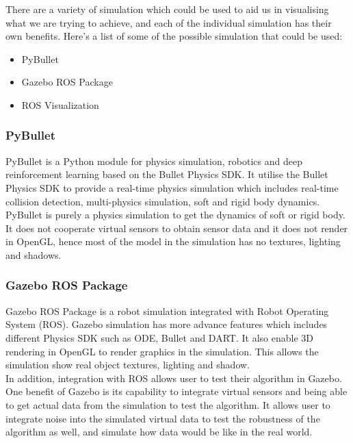 \documentclass[12pt,A4]{article}
\begin{document}
	There are a variety of simulation which could be used to aid us in visualising what we are trying to achieve, and each of the individual simulation has their own benefits. Here's a list of some of the possible simulation that could be used:
	
	\begin{itemize}
		\item PyBullet
		\item Gazebo ROS Package
		\item ROS Visualization
	\end{itemize}
	
	\subsubsection{PyBullet}
	\hfill\begin{minipage}{\dimexpr\textwidth-1cm}
	PyBullet is a Python module for physics simulation, robotics and deep reinforcement learning based on the Bullet Physics SDK. It utilise the Bullet Physics SDK to provide a real-time physics simulation which includes real-time collision detection, multi-physics simulation, soft and rigid body dynamics.\\ %
	
	PyBullet is purely a physics simulation to get the dynamics of soft or rigid body. It does not cooperate virtual sensors to obtain sensor data and it does not render in OpenGL, hence most of the model in the simulation has no textures, lighting and shadows.\\
	\end{minipage}
	
	\subsubsection{Gazebo ROS Package}
	\hfill\begin{minipage}{\dimexpr\textwidth-1cm}
	Gazebo ROS Package is a robot simulation integrated with Robot Operating System (ROS). Gazebo simulation has more advance features which includes different Physics SDK such as ODE, Bullet and DART. It also enable 3D rendering in OpenGL to render graphics in the simulation. This allows the simulation show real object textures, lighting and shadow.\\ %
	
	In addition, integration with ROS allows user to test their algorithm in Gazebo. One benefit of Gazebo is its capability to integrate virtual sensors and being able to get actual data from the simulation to test the algorithm. It allows user to integrate noise into the simulated virtual data to test the robustness of the algorithm as well, and simulate how data would be like in the real world.\\
	\end{minipage}
	
\end{document}
